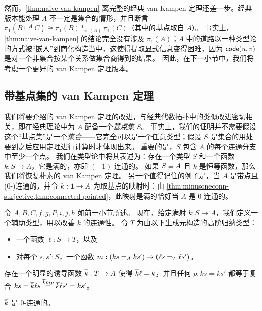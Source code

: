 %

然而，\cref{thm:naive-van-kampen} 离完整的经典 van Kampen 定理还差一步。经典版本能处理 $A$ 不一定是集合的情形，并且断言 $\pi_1(B\sqcup^A C) \cong \pi_1(B) *_{\pi_1(A)} \pi_1(C)$（其中的基点取自 $A$）。
事实上，\cref{thm:naive-van-kampen} 的结论完全没有涉及 $\pi_1(A)$；$A$ 中的道路以一种类型论的方式被``嵌入''到商化构造当中，这使得提取显式信息变得困难，因为 $\code(u,v)$ 是对一个非集合按某个关系做集合商得到的结果。
因此，在下一小节中，我们将考虑一个更好的 van Kampen 定理版本。

\subsection{带基点集的 van Kampen 定理}
\label{sec:better-vankampen}

%
我们将要介绍的 van Kampen 定理的改进，与经典代数拓扑中的类似改进密切相关，即在经典理论中为 $A$ 配备一个\emph{基点集 $S$}。
事实上，我们的证明并不需要假设这个``基点集''是一个\emph{集合}——它完全可以是一个任意类型；假设 $S$ 是集合的用处要到之后应用定理进行计算时才体现出来。
重要的是，$S$ 包含 $A$ 的每个连通分支中至少一个点。
我们在类型论中将其表述为：存在一个类型 $S$ 和一个函数 $k:S \to A$，它是满的，亦即 $(-1)$-连通的。
如果 $S\jdeq A$ 且 $k$ 是恒等函数，那么我们将恢复朴素的 van Kampen 定理。
另一个值得记住的例子是，当 $A$ 是带点且 (0-)连通的，并令 $k:\unit\to A$ 为取基点的映射时：由 \cref{thm:minusoneconn-surjective,thm:connected-pointed}，此映射是满的恰好当 $A$ 是 0-连通的。

令 $A,B,C,f,g,P,i,j,h$ 如前一小节所述。
现在，给定满射 $k:S\to A$，我们定义一个辅助类型，用以改善 $k$ 的连通性。
令 $T$ 为由以下生成元构造的高阶归纳类型：

\begin{itemize}
\item 一个函数 $\ell:S\to T$，以及
\item 对每个 $s,s':S$，一个函数 $m:(\id[A]{ks}{ks'}) \to (\id[T]{\ell s}{\ell s'})$。
\end{itemize}

存在一个明显的诱导函数 $\kbar:T\to A$ 使得 $\kbar \ell = k$，并且任何 $p:ks=ks'$ 都等于复合 $ks = \kbar \ell s \overset{\kbar m p}{=} \kbar \ell s' = k s'$。

\begin{lem}\label{thm:kbar}
  $\kbar$ 是 0-连通的。
\end{lem}


